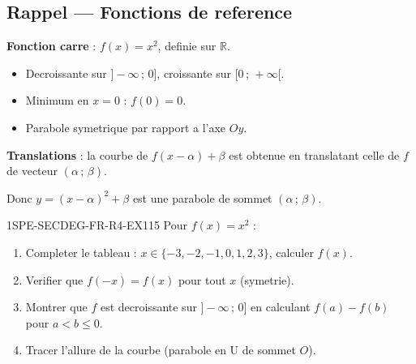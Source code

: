 

\subsection*{Rappel — Fonctions de reference}

\textbf{Fonction carre} : $f(x) = x^2$, definie sur $\mathbb{R}$.
\begin{itemize}
  \item Decroissante sur $]-\infty\,;\,0]$, croissante sur $[0\,;\,+\infty[$.
  \item Minimum en $x = 0$ : $f(0) = 0$.
  \item Parabole symetrique par rapport a l'axe $Oy$.
\end{itemize}

\textbf{Translations} : la courbe de $f(x-\alpha) + \beta$ est obtenue en translatant celle de $f$ de vecteur $(\alpha\,;\,\beta)$.

Donc $y = (x-\alpha)^2 + \beta$ est une parabole de sommet $(\alpha\,;\,\beta)$.


\begin{exercice}{1SPE-SECDEG-FR-R4-EX1}{1}{5}
Pour $f(x) = x^2$ :
\begin{enumerate}
  \item Completer le tableau : $x \in \{-3, -2, -1, 0, 1, 2, 3\}$, calculer $f(x)$.
  \item Verifier que $f(-x) = f(x)$ pour tout $x$ (symetrie).
  \item Montrer que $f$ est decroissante sur $]-\infty\,;\,0]$ en calculant $f(a) - f(b)$ pour $a < b \leq 0$.
  \item Tracer l'allure de la courbe (parabole en U de sommet $O$).
\end{enumerate}
\end{exercice}


